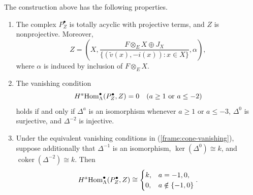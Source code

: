 \documentclass[11pt]{article}
\begin{document}
\begin{Theo}\label{frame:cone}
The construction above has the following properties.
\begin{enumerate}
\item\label{frame:cone-properties}
The complex $P_Z^\bullet$ is totally acyclic with projective
terms, and $Z$ is nonprojective. Moreover,
\begin{equation*}
 Z=\left(X,
 \frac{F\otimes_E X\oplus J_X}
      {\{(\widetilde v(x),-i(x)):x\in X\}},\alpha\right),
\end{equation*}
where $\alpha$ is induced by inclusion of $F\otimes_E X$.

\item\label{frame:cone-vanishing}
The vanishing condition
\begin{equation*}
 H^a{\rm Hom}_\Lambda^\bullet(P_Z^\bullet,Z)=0
       \quad(a\geq1\text{ or }a\leq-2)
\end{equation*}
holds if and only if $\Delta^a$ is an isomorphism whenever $a\geq1$
or $a\leq-3$, $\Delta^0$ is surjective, and $\Delta^{-2}$ is
injective.

\item\label{frame:cone-support}
Under the equivalent vanishing conditions in
\textup{(\ref{frame:cone-vanishing})}, suppose additionally that
$\Delta^{-1}$ is an isomorphism, $\ker(\Delta^0)\cong k$, and
$\operatorname{coker}(\Delta^{-2})\cong k$. Then
\begin{equation*}
 H^a{\rm Hom}_\Lambda^\bullet(P_Z^\bullet,Z)\cong
 \begin{cases}k,&a=-1,0,\\0,&a\notin\{-1,0\}\end{cases}.
\end{equation*}
\end{enumerate}
\end{Theo}
\end{document}
